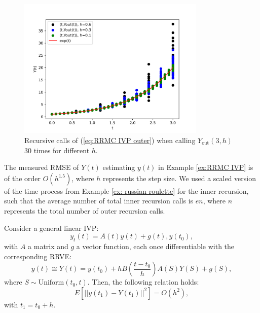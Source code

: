 \documentclass[a4paper,12pt]{article}
\begin{document}
\begin{pythonn} \label{py:RRMC IVP}

    \begin{figure}[h!]
        \centering
        \includegraphics[width=0.8\textwidth]{plots/RRMC IVP.png}
        \caption{Recursive calls of (\ref{eq:RRMC IVP outer})
            when calling $Y_{\text{out}}(3,h)$ $30$ times for different $h$.  }
        \label{fig:RRMC IVP}
    \end{figure}
\end{pythonn}

The measured RMSE of $Y(t)$ estimating $y(t)$ in Example
\ref{ex:RRMC IVP} is of the order $O\left(h^{1.5} \right)$, where $h$ represents
the step size.
We used a scaled version of the time process from Example \ref{ex: russian roulette}
for the inner recursion, such that the average number of total inner recursion calls
is $e n$, where $n$ represents the total number of outer recursion calls.

\begin{conjecture}
    Consider a general linear IVP:
    \begin{equation}
        y_{t}(t)= A(t)y(t)+g(t), y(t_{0}),
    \end{equation}
    with $A$ a matrix and $g$ a vector function, each
    once differentiable with the corresponding RRVE:
    \begin{equation}
        y(t) \cong Y(t) = y(t_{0}) + h B \left( \frac{t-t_{0}}{h}\right)
        A(S) Y(S) + g(S),
    \end{equation}
    where $S \sim \text{Uniform}(t_{0},t)$. Then, the following relation holds:
    \begin{equation}
        E[||y(t_{1})-Y(t_{1})||^{2}] = O(h^{2}),
    \end{equation}
    with $t_{1} = t_{0} + h$.
\end{conjecture}
\end{document}
